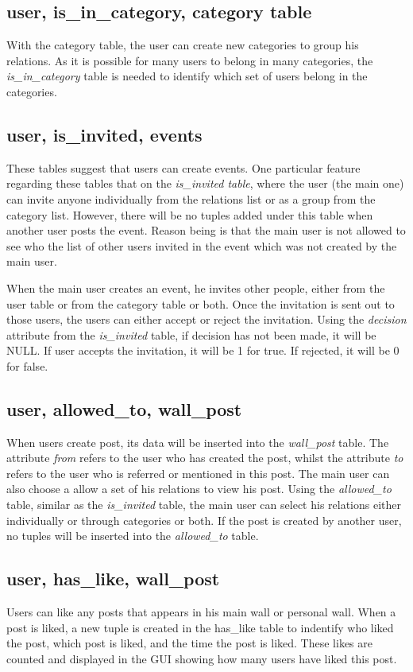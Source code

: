 \subsection{user, is\_in\_category, category table}
With the category table, the user can create new categories to group his relations. As it is possible for many users to belong in many categories, the {\it is\_in\_category} table is needed to identify which set of users belong in the categories.

\subsection{user, is\_invited, events}
These tables suggest that users can create events. One particular feature regarding these tables that on the {\it is\_invited table}, where the user (the main one) can invite anyone individually from the relations list or as a group from the category list. However, there will be no tuples added under this table when another user posts the event. Reason being is that the main user is not allowed to see who the list of other users invited in the event which was not created by the main user. 

When the main user creates an event, he invites other people, either from the user table or from the category table or both. Once the invitation is sent out to those users, the users can either accept or reject the invitation. Using the {\it decision} attribute from the {\it is\_invited} table, if decision has not been made, it will be NULL. If user accepts the invitation, it will be 1 for true. If rejected, it will be 0 for false. 

\subsection{user, allowed\_to, wall\_post}
When users create post, its data will be inserted into the {\it wall\_post} table. The attribute {\it from} refers to the user who has created the post, whilst the attribute {\it to} refers to the user who is referred or mentioned in this post. The main user can also choose a allow a set of his relations to view his post. Using the {\it allowed\_to} table, similar as the {\it is\_invited} table, the main user can select his relations either individually or through categories or both. If the post is created by another user, no tuples will be inserted into the {\it allowed\_to} table.

\subsection{user, has\_like, wall\_post}
Users can like any posts that appears in his main wall or personal wall. When a post is liked, a new tuple is created in the has\_like table to indentify who liked the post, which post is liked, and the time the post is liked. These likes are counted and displayed in the GUI showing how many users have liked this post.

